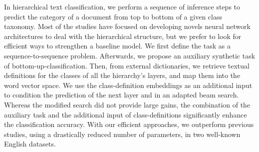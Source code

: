 In hierarchical text classification, we perform a sequence of inference steps to predict the category of a document from top to bottom of a given class taxonomy. Most of the studies have focused on developing novels neural network architectures to deal with the hierarchical structure, but we prefer to look for efficient ways to strengthen a baseline model. We first define the task as a sequence-to-sequence problem. Afterwards, we propose an auxiliary synthetic task of bottom-up-classification. Then, from external dictionaries, we retrieve textual definitions for the classes of all the hierarchy's layers, and map them into the word vector space. We use the class-definition embeddings as an additional input to condition the prediction of the next layer and in an adapted beam search. Whereas the modified search did not provide large gains, the combination of the auxiliary task and the additional input of class-definitions significantly enhance the classification accuracy. With our efficient approaches, we outperform previous studies, using a drastically reduced number of parameters, in two well-known English datasets.
